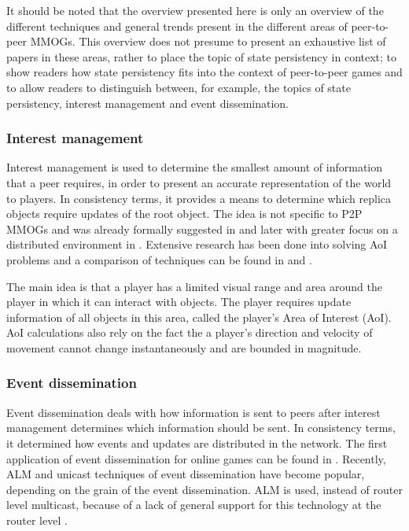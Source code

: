 \documentclass[10pt,a4paper,journal,cspaper,compsoc]{IEEEtran}
\begin{document}
It should be noted that the overview presented here is only an overview of the different techniques and general trends present in the different areas
of peer-to-peer MMOGs. This overview does not presume to present an exhaustive list of papers in these areas, rather to place the topic of state
persistency in context; to show readers how state persistency fits into the context of peer-to-peer games and to allow readers to distinguish
between, for example, the topics of state persistency, interest management and event dissemination.

\subsubsection{Interest management}
\label{key_challenges_im}

Interest management is used to determine the smallest amount of information that a peer requires, in order to present an accurate representation of
the world to players. In consistency terms, it provides a means to determine which replica objects require updates of the root object. The idea is
not specific to P2P MMOGs and was already formally suggested in \cite{First_IM} and later with greater focus on a distributed environment in
\cite{Whang_agent_based_IM}. Extensive research has been done into solving AoI problems and a comparison of techniques can be found in
\cite{Boulanger_IM_compare} and \cite{IM_and_ED_survey_Krause}.

The main idea is that a player has a limited visual range and area around the player in which it can interact with objects. The player requires
update information of all objects in this area, called the player's Area of Interest (AoI). AoI calculations also rely on the fact the a player's
direction and velocity of movement cannot change instantaneously and are bounded in magnitude.

\subsubsection{Event dissemination}

Event dissemination deals with how information is sent to peers after interest management determines which information should be sent. In consistency
terms, it determined how events and updates are distributed in the network. The first application of event dissemination for online games can be
found in \cite{first_GED}. Recently, ALM and unicast techniques of event dissemination have become popular, depending on the grain of the event
dissemination. ALM is used, instead of router level multicast, because of a lack of general support for this technology at the router level
\cite{ip_multicast_deployment_issues}.
\end{document}
